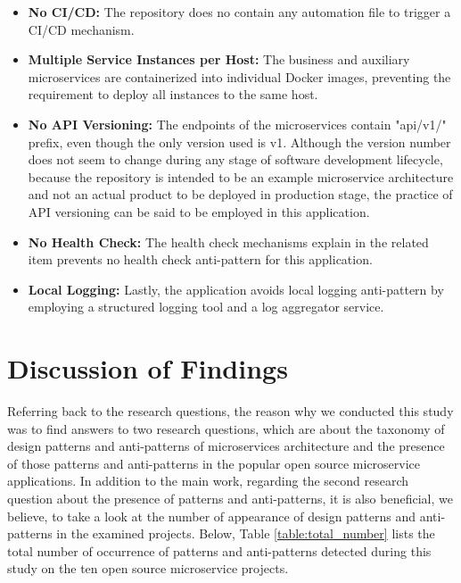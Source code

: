 \documentclass{Configuration_Files/PoliMi3i_thesis}
\begin{document}
\begin{itemize}
    \item \textbf{No CI/CD:} The repository does no contain any automation file to trigger a CI/CD mechanism.
    
    \item \textbf{Multiple Service Instances per Host:} The business and auxiliary microservices are containerized into individual Docker images, preventing the requirement to deploy all instances to the same host.
    
    \item \textbf{No API Versioning:} The endpoints of the microservices contain "api/v1/" prefix, even though the only version used is v1.
    Although the version number does not seem to change during any stage of software development lifecycle, because the repository is intended to be an example microservice architecture and not an actual product to be deployed in production stage, the practice of API versioning can be said to be employed in this application.
    
    \item \textbf{No Health Check:} The health check mechanisms explain in the related item prevents no health check anti-pattern for this application.
    
    \item \textbf{Local Logging:} Lastly, the application avoids local logging anti-pattern by employing a structured logging tool and a log aggregator service.
\end{itemize}

\section{Discussion of Findings}
\label{sec:discussion}

Referring back to the research questions, the reason why we conducted this study was to find answers to two research questions, which are about the taxonomy of design patterns and anti-patterns of microservices architecture and the presence of those patterns and anti-patterns in the popular open source microservice applications. 
In addition to the main work, regarding the second research question about the presence of patterns and anti-patterns, it is also beneficial, we believe, to take a look at the number of appearance of design patterns and anti-patterns in the examined projects.
Below, Table \ref{table:total_number} lists the total number of occurrence of patterns and anti-patterns detected during this study on the ten open source microservice projects.
\end{document}

